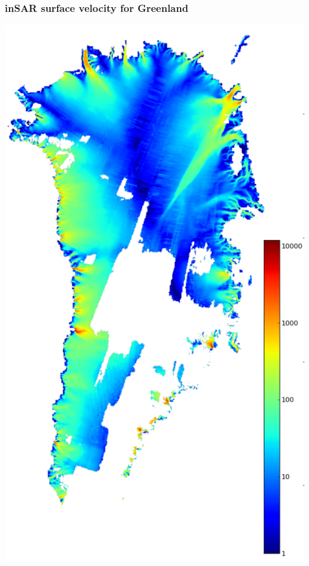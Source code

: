\documentclass{beamer}
\begin{document}
\begin{frame}
  \frametitle{inSAR surface velocity for Greenland}

\begin{center}
  \includegraphics[height=0.85\textheight]{joughin}
\end{center}
\end{frame}
\end{document}
